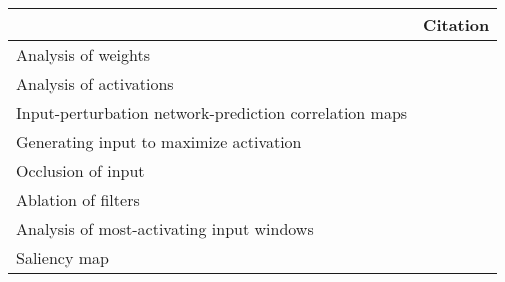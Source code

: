 \begin{tabular}{ll}
\toprule
{} &                                                                                                                                                                                          Citation \\
\midrule
Analysis of weights                                    &  \cite{Perez-Benitez2018, Yoon2018, Langkvist2018, Deiss2018, Lawhern2018, Xu2016, Tsinalis2016a, Nurse2016, Tabar2016a, Zheng2015, Stober2015, Manor2015, Yang2015a, Langkvist2012, Cecotti2011} \\
Analysis of activations                                &                                                                                           \cite{Yuan2018a, Waytowich2018, Lawhern2018, kwak2017, Yin2017a, Supratak2017, Shamwell2016, Manor2015} \\
Input-perturbation network-prediction correlation maps &                                                                                                              \cite{Schirrmeister2017a, Volker2018, Hartmann2018b, Behncke2017, Schirrmeister2017} \\
Generating input to maximize activation                &                                                                                                                                      \cite{VanPutten2018b, Ruffini2018a, Sors2018, Bashivan2016a} \\
Occlusion of input                                     &                                                                                                                                                        \cite{Lee2018, Chambon2018, Thodoroff2016} \\
Ablation of filters                                    &                                                                                                                                                                                \cite{Lawhern2018} \\
Analysis of most-activating input windows              &                                                                                                                                                                              \cite{Hartmann2018b} \\
Saliency map                                           &                                                                                                                                                                               \cite{Vilamala2017} \\

\end{tabular}
